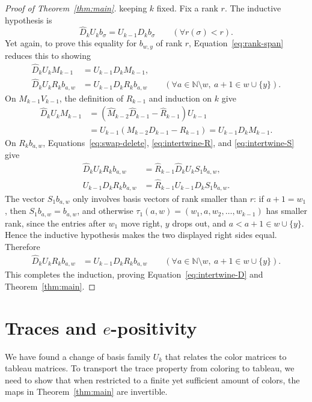 \documentclass[12pt]{article}
\theoremstyle{plain}
\theoremstyle{definition}
\theoremstyle{remark}
\newcommand{\bN}{\mathbb{N}}
\begin{document}
\begin{proof}[Proof of Theorem~\ref{thm:main}]
keeping $k$ fixed. Fix a rank $r$. The inductive hypothesis is
\[
\hat D_kU_kb_\sigma=U_{k-1}D_kb_\sigma\qquad(\forall r(\sigma)<r).
\]
Yet again, to prove this equality for $b_{w,y}$ of rank $r$,
Equation~\eqref{eq:rank-span} reduces this to showing
\begin{align*}
\hat D_kU_kM_{k-1}&=U_{k-1}D_kM_{k-1},\\
\hat D_kU_kR_kb_{a,w}&=U_{k-1}D_kR_kb_{a,w}
\qquad(\forall a\in\bN\setminus w,\ a+1\in w\cup\{y\}).
\end{align*}
On $M_{k-1}V_{k-1}$, the definition of $R_{k-1}$ and induction on $k$
give
\begin{align*}
\hat D_kU_kM_{k-1}
 &=(\hat M_{k-2}\hat D_{k-1}-\hat R_{k-1})U_{k-1}\\
 &=U_{k-1}(M_{k-2}D_{k-1}-R_{k-1})
 =U_{k-1}D_kM_{k-1}.
\end{align*}
On $R_kb_{a,w}$, Equations~\eqref{eq:swap-delete},
\eqref{eq:intertwine-R}, and \eqref{eq:intertwine-S} give
\begin{align*}
\hat D_kU_kR_kb_{a,w}
 &=\hat R_{k-1}\hat D_kU_kS_1b_{a,w},\\
U_{k-1}D_kR_kb_{a,w}
 &=\hat R_{k-1}U_{k-1}D_kS_1b_{a,w}.
\end{align*}
The vector $S_1b_{a,w}$ only involves basis vectors of rank smaller than $r$: if $a+1=w_1$, then $S_1b_{a,w}=b_{a,w}$, and otherwise $\tau_1(a,w)=(w_1,a,w_2,\dots,w_{k-1})$ has smaller rank, since the entries after $w_1$ move right, $y$ drops out, and $a<a+1\in w\cup\{y\}$. Hence the inductive hypothesis makes the two displayed
right sides equal. Therefore
\begin{align*}
\hat D_kU_kR_kb_{a,w}&=U_{k-1}D_kR_kb_{a,w}
\qquad(\forall a\in\bN\setminus w,\ a+1\in w\cup\{y\}).
\end{align*}
This completes the induction, proving Equation~\eqref{eq:intertwine-D} and Theorem~\ref{thm:main}.
\end{proof}

\section{Traces and \texorpdfstring{$e$}{e}-positivity}\label{section:trace}

We have found a change of basis family $U_k$ that relates the color matrices to tableau matrices. To transport the trace property from coloring to tableau, we need to show that when restricted to a finite yet sufficient amount of colors, the maps in Theorem~\ref{thm:main} are invertible.
\end{document}
